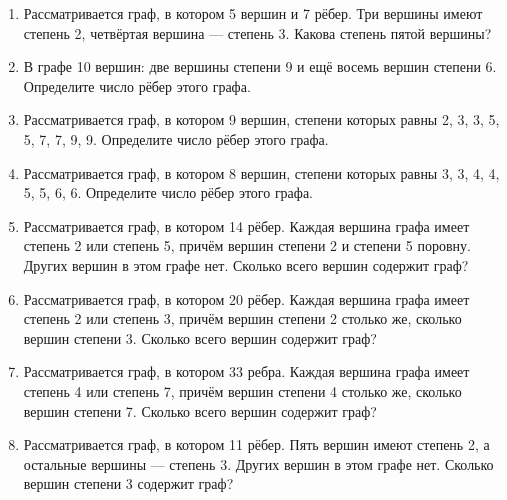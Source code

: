 \documentclass[a4paper,12pt]{article}
\newcommand{\taskspace}{\par\vspace{0.42cm}}
\begin{document}
\begin{enumerate}[resume]
\taskspace

\item Рассматривается граф, в котором 5 вершин и 7 рёбер. Три вершины имеют степень 2, четвёртая вершина --- степень 3. Какова степень пятой вершины?

\taskspace

\item В графе 10 вершин: две вершины степени 9 и ещё восемь вершин степени 6. Определите число рёбер этого графа.

\taskspace

\item Рассматривается граф, в котором 9 вершин, степени которых равны 2, 3, 3, 5, 5, 7, 7, 9, 9. Определите число рёбер этого графа.

\taskspace

\item Рассматривается граф, в котором 8 вершин, степени которых равны 3, 3, 4, 4, 5, 5, 6, 6. Определите число рёбер этого графа.

\taskspace

\item Рассматривается граф, в котором 14 рёбер. Каждая вершина графа имеет степень 2 или степень 5, причём вершин степени 2 и степени 5 поровну. Других вершин в этом графе нет. Сколько всего вершин содержит граф?

\taskspace

\item Рассматривается граф, в котором 20 рёбер. Каждая вершина графа имеет степень 2 или степень 3, причём вершин степени 2 столько же, сколько вершин степени 3. Сколько всего вершин содержит граф?

\taskspace

\item Рассматривается граф, в котором 33 ребра. Каждая вершина графа имеет степень 4 или степень 7, причём вершин степени 4 столько же, сколько вершин степени 7. Сколько всего вершин содержит граф?

\taskspace

\item Рассматривается граф, в котором 11 рёбер. Пять вершин имеют степень 2, а остальные вершины --- степень 3. Других вершин в этом графе нет. Сколько вершин степени 3 содержит граф?


\end{enumerate}
\end{document}
